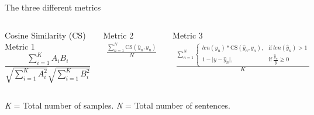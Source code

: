 \documentclass[10pt]{beamer}
\begin{document}
\begin{frame}[fragile]{The three different metrics}

\begin{columns}[T,onlytextwidth]

\begin{block}{Cosine Similarity (CS) Metric 1}
\begin{equation}
\frac{ \sum\limits_{i=1}^{K}{A_i  B_i} }{ \sqrt{\sum\limits_{i=1}^{K}{A_i^2}}  \sqrt{\sum\limits_{i=1}^{K}{B_i^2}} }
\end{equation}
\end{block}

\begin{block}{Metric 2}
\begin{equation}
\label{eq:first_eval}
\begin{gathered}
\frac{\sum_{n=1}^{N} \text{CS}(\hat y_n, y_n)}{N}
\end{gathered}
\end{equation}
\end{block}

\begin{block}{Metric 3}
\begin{equation}
\begin{gathered}
\frac{\sum_{n=1}^{N} \begin{cases}len(\hat y_n) * \text{CS}(\hat y_n, y_n), & \text{if}\ len(\hat y_n) > 1 \\
      1 - \lvert y - \hat y_n \rvert, & \text{if}\ \frac{\hat y_n}{y}\geq0
      \end{cases} }{K}
\end{gathered}
\end{equation}

\end{block}

\end{columns}
\textit{K} = Total number of samples. \newline
\textit{N} = Total number of sentences.


\end{frame}
\end{document}
